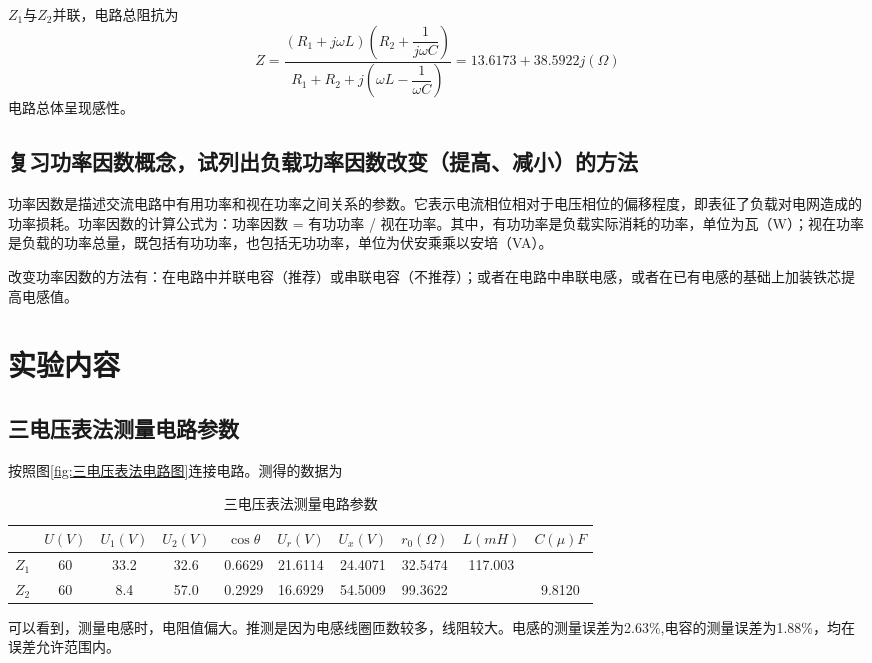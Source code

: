 \documentclass{ctexart}
\begin{document}
$Z_1$与$Z_2$并联，电路总阻抗为
\begin{equation}
    Z=\dfrac{(R_1+j\omega L)(R_2+\dfrac{1}{j\omega C})}{R_1+R_2+j(\omega L - \dfrac{1}{\omega C})}=13.6173+38.5922j(\Omega)
\end{equation}
电路总体呈现感性。
\subsection{复习功率因数概念，试列出负载功率因数改变（提高、减小）的方法}
功率因数是描述交流电路中有用功率和视在功率之间关系的参数。它表示电流相位相对于电压相位的偏移程度，即表征了负载对电网造成的功率损耗。功率因数的计算公式为：功率因数 = 有功功率 / 视在功率。其中，有功功率是负载实际消耗的功率，单位为瓦（W）；视在功率是负载的功率总量，既包括有功功率，也包括无功功率，单位为伏安乘乘以安培（VA）。

改变功率因数的方法有：在电路中并联电容（推荐）或串联电容（不推荐）；或者在电路中串联电感，或者在已有电感的基础上加装铁芯提高电感值。
\section{实验内容}
\subsection{三电压表法测量电路参数}
按照图\ref{fig:三电压表法电路图}连接电路。测得的数据为
\begin{table}[!ht]
    \centering
    \begin{tabular}{|c|c|c|c|c|c|c|c|c|c|}
    \hline
        ~ & $U(V)$ & $U_1(V)$ & $U_2(V)$ & $\cos \theta$ &$U_r(V)$ &$U_x(V)$ &$r_0(\Omega)$ &$L(mH)$ &$C(\mu)F$ \\ \hline
        $Z_1$ & 60&33.2&32.6&0.6629&21.6114&24.4071&32.5474&117.003&~\\ \hline
        $Z_2$&60&8.4&57.0&0.2929&16.6929&54.5009&99.3622& ~&9.8120\\ \hline
    \end{tabular}
    \caption{三电压表法测量电路参数}
    \label{tab:三电压表法测量电路参数}
\end{table}
可以看到，测量电感时，电阻值偏大。推测是因为电感线圈匝数较多，线阻较大。电感的测量误差为2.63\%,电容的测量误差为1.88\%，均在误差允许范围内。
\end{document}
